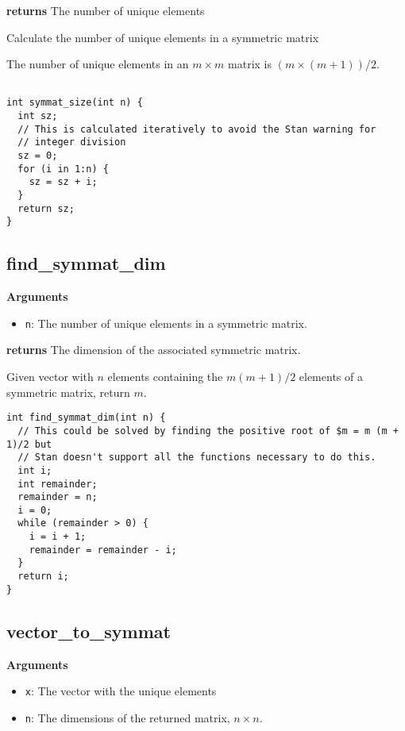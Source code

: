 \documentclass[]{book}
\providecommand{\tightlist}{%
  \setlength{\itemsep}{0pt}\setlength{\parskip}{0pt}}
\begin{document}
\textbf{returns} The number of unique elements

Calculate the number of unique elements in a symmetric matrix

The number of unique elements in an \(m \times m\) matrix is
\((m \times (m + 1)) / 2\).

\begin{verbatim}

int symmat_size(int n) {
  int sz;
  // This is calculated iteratively to avoid the Stan warning for
  // integer division
  sz = 0;
  for (i in 1:n) {
    sz = sz + i;
  }
  return sz;
}

\end{verbatim}

\subsection{find\_symmat\_dim}\label{find_symmat_dim}

\textbf{Arguments}

\begin{itemize}
\tightlist
\item
  \texttt{n}: The number of unique elements in a symmetric matrix.
\end{itemize}

\textbf{returns} The dimension of the associated symmetric matrix.

Given vector with \(n\) elements containing the \(m (m + 1) / 2\)
elements of a symmetric matrix, return \(m\).

\begin{verbatim}
int find_symmat_dim(int n) {
  // This could be solved by finding the positive root of $m = m (m + 1)/2 but
  // Stan doesn't support all the functions necessary to do this.
  int i;
  int remainder;
  remainder = n;
  i = 0;
  while (remainder > 0) {
    i = i + 1;
    remainder = remainder - i;
  }
  return i;
}

\end{verbatim}

\subsection{vector\_to\_symmat}\label{vector_to_symmat}

\textbf{Arguments}

\begin{itemize}
\tightlist
\item
  \texttt{x}: The vector with the unique elements
\item
  \texttt{n}: The dimensions of the returned matrix, \(n \times n\).
\end{itemize}
\end{document}

